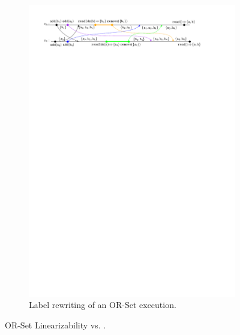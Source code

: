 \begin{figure}[t]
  \vspace{2mm}
  \begin{subfigure}{.9\linewidth}
    \centering
    \includegraphics[width=0.95 \textwidth]{./figures/OR-Set-lk-rem}
    \caption{Label rewriting of an OR-Set execution.}
    \label{fig:or-set-lk-rem}
  \end{subfigure}
  \vspace{-2mm}
  \caption{OR-Set Linearizability vs. \CRDTLinshort{}.}
  \vspace{-5mm}
\end{figure}



